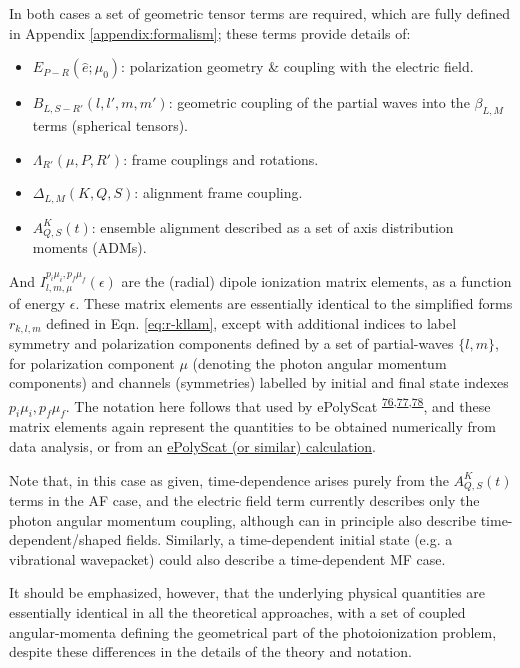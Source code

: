 \documentclass[10pt]{article}
\begin{document}
In both cases a set of geometric tensor terms are required, which are fully defined in Appendix \ref{appendix:formalism}; these terms provide details of:

\begin{itemize}
\item ${E_{P-R}(\hat{e};\mu_{0})}$: polarization geometry \& coupling with the electric field.
\item $B_{L,S-R'}(l,l',m,m')$: geometric coupling of the partial waves into the $\beta_{L,M}$ terms (spherical tensors).
\item $\Lambda_{R'}(\mu,P,R')$: frame couplings and rotations.
\item $\Delta_{L,M}(K,Q,S)$: alignment frame coupling.
\item $A_{Q,S}^{K}(t)$: ensemble alignment described as a set of axis distribution moments (ADMs).
\end{itemize}

And \(I_{l,m,\mu}^{p_{i}\mu_{i},p_{f}\mu_{f}}(\epsilon)\) are the (radial) dipole ionization matrix elements, as a function of energy \(\epsilon\). These matrix elements are essentially identical to the simplified forms $r_{k,l,m}$ defined in Eqn. \ref{eq:r-kllam}, except with additional indices to label symmetry and polarization components
defined by a set of partial-waves \(\{l,m\}\), for polarization component \(\mu\) (denoting the photon angular momentum components) and channels (symmetries) labelled by initial and final state indexes \({p_{i}\mu_{i},p_{f}\mu_{f}}\). The notation here follows that used by ePolyScat \textsuperscript{\hyperref[csl:76]{76},\hyperref[csl:77]{77},\hyperref[csl:78]{78}}, and these matrix elements again represent the quantities  to be obtained numerically from data analysis, or from an \href{https://epsproc.readthedocs.io/en/latest/ePS_ePSproc_tutorial/ePS_tutorial_080520.html\#Theoretical-background}{ePolyScat (or similar) calculation}. 

Note that, in this case as given, time-dependence arises purely from the \(A_{Q,S}^{K}(t)\) terms in the AF case, and the electric field term currently describes only the photon angular momentum coupling,
although can in principle also describe time-dependent/shaped fields. Similarly, a time-dependent initial state (e.g. a vibrational wavepacket) could also describe a time-dependent MF case.

It should be emphasized, however, that the underlying physical quantities are essentially identical in all the theoretical approaches, with a set of coupled angular-momenta defining the geometrical part of the photoionization problem, despite these differences in the details of the theory and notation. 
\end{document}
